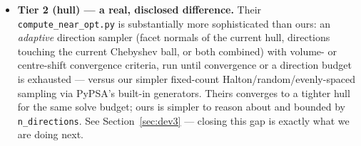 \documentclass[11pt]{article}
\begin{document}
\begin{itemize}[leftmargin=1.4em]
    the current API, not a literal reuse.
  \item \textbf{Tier 2 (hull) --- a real, disclosed difference.} Their
    \texttt{compute\_near\_opt.py} is substantially more sophisticated than
    ours: an \emph{adaptive} direction sampler (facet normals of the
    current hull, directions touching the current Chebyshev ball, or both
    combined) with volume- or centre-shift convergence criteria, run until
    convergence or a direction budget is exhausted --- versus our simpler
    fixed-count Halton/random/evenly-spaced sampling via PyPSA's built-in
    generators. Theirs converges to a tighter hull for the same solve
    budget; ours is simpler to reason about and bounded by
    \texttt{n\_directions}. See Section~\ref{sec:dev3} --- closing this gap
    is exactly what we are doing next.
\end{itemize}
\end{document}

